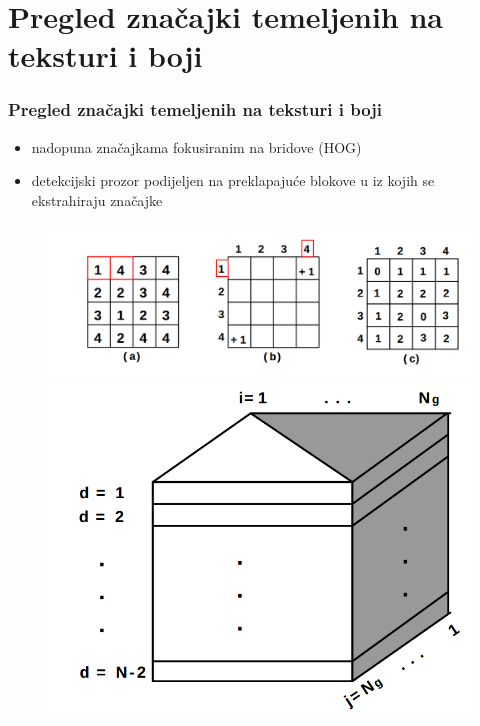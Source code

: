 \documentclass{beamer}
\begin{document}
\section{Pregled značajki temeljenih na teksturi i boji}
\begin{frame}
\frametitle{Pregled značajki temeljenih na teksturi i boji}
\begin{itemize}
\item nadopuna značajkama fokusiranim na bridove (HOG) \cite{HOG}
\item detekcijski prozor podijeljen na preklapajuće blokove u iz kojih se ekstrahiraju značajke
\end{itemize}
\begin{figure}
\includegraphics[scale=0.15]{img/matrix.png}
\includegraphics[scale=0.1]{img/cube.png}
\end{figure}
\end{frame}
\end{document}
